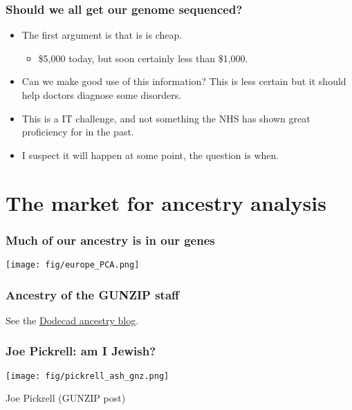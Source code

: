 \documentclass{beamer}
\begin{document}
\begin{frame}
  \frametitle{Should we all get our genome sequenced?}
  \begin{itemize}
  \item The first argument is that is is cheap.
    \begin{itemize}
    \item \$5,000 today, but soon certainly less than \$1,000.
    \end{itemize}
  \item Can we make good use of this information? This is less certain but it should help doctors diagnose some disorders.
  \item This is a IT challenge, and not something the NHS has shown great proficiency for in the past.
  \item I suspect it will happen at some point, the question is when.
  \end{itemize}
\end{frame}





\section{The market for ancestry analysis}

\begin{frame}
  \frametitle{Much of our ancestry is in our genes}
  \begin{center}
    \texttt{[image: fig/europe\_PCA.png]}
  \end{center}
\end{frame}


\begin{frame}
  \frametitle{Ancestry of the GUNZIP staff}
  \begin{center}
  \end{center}
  See the \href{http://dodecad.blogspot.co.uk/}{Dodecad ancestry blog}.
\end{frame}


\begin{frame}
  \frametitle{Joe Pickrell: am I Jewish?}
  \begin{center}
    \texttt{[image: fig/pickrell\_ash\_gnz.png]}
  \end{center}
  Joe Pickrell (GUNZIP post)
\end{frame}
\end{document}
